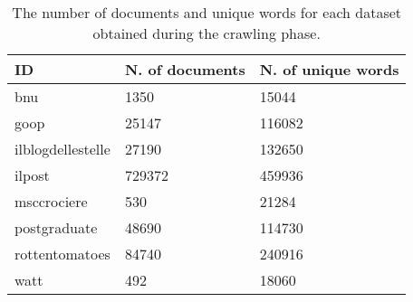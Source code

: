 \begin{table}[H]
    \begin{center}
        \begin{tabular}{ |l|l|l| }
            \hline
            ID                & N. of documents & N. of unique words \\
            \hline
            \hline
            bnu               & 1350            & 15044              \\
            \hline
            goop              & 25147           & 116082             \\
            \hline
            ilblogdellestelle & 27190           & 132650             \\
            \hline
            ilpost            & 729372          & 459936             \\
            \hline
            msccrociere       & 530             & 21284              \\
            \hline
            postgraduate      & 48690           & 114730             \\
            \hline
            rottentomatoes    & 84740           & 240916             \\
            \hline
            watt              & 492             & 18060              \\
            \hline
        \end{tabular}
    \end{center}
    \caption{The number of documents and unique words for each dataset obtained during the crawling phase.}
    \label{table:dbdata}
\end{table}